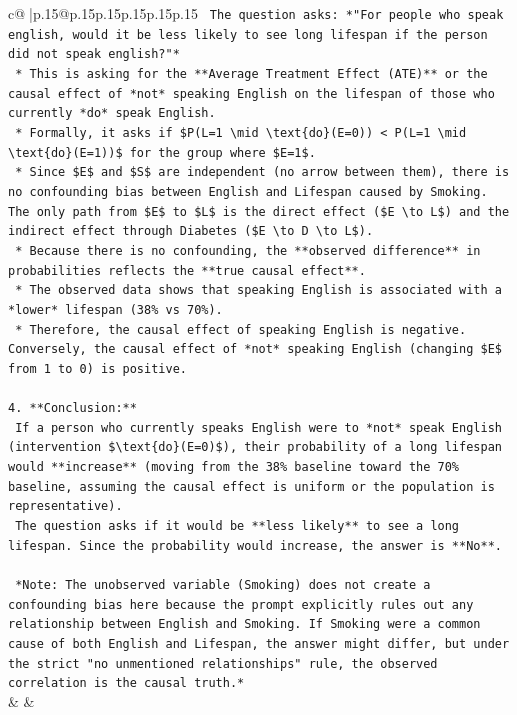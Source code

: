 \documentclass{article}
\begin{document}
{\begin{supertabular}{c@{$\;$}|p{.15\linewidth}@{}p{.15\linewidth}p{.15\linewidth}p{.15\linewidth}p{.15\linewidth}p{.15\linewidth}}
{{{\texttt{    The question asks: *"For people who speak english, would it be less likely to see long lifespan if the person did not speak english?"*} \\
\texttt{    *   This is asking for the **Average Treatment Effect (ATE)** or the causal effect of *not* speaking English on the lifespan of those who currently *do* speak English.} \\
\texttt{    *   Formally, it asks if \$P(L=1 \textbackslash{}mid \textbackslash{}text\{do\}(E=0)) < P(L=1 \textbackslash{}mid \textbackslash{}text\{do\}(E=1))\$ for the group where \$E=1\$.} \\
\texttt{    *   Since \$E\$ and \$S\$ are independent (no arrow between them), there is no confounding bias between English and Lifespan caused by Smoking. The only path from \$E\$ to \$L\$ is the direct effect (\$E \textbackslash{}to L\$) and the indirect effect through Diabetes (\$E \textbackslash{}to D \textbackslash{}to L\$).} \\
\texttt{    *   Because there is no confounding, the **observed difference** in probabilities reflects the **true causal effect**.} \\
\texttt{    *   The observed data shows that speaking English is associated with a *lower* lifespan (38\% vs 70\%).} \\
\texttt{    *   Therefore, the causal effect of speaking English is negative. Conversely, the causal effect of *not* speaking English (changing \$E\$ from 1 to 0) is positive.} \\
\\ 
\texttt{4.  **Conclusion:**} \\
\texttt{    If a person who currently speaks English were to *not* speak English (intervention \$\textbackslash{}text\{do\}(E=0)\$), their probability of a long lifespan would **increase** (moving from the 38\% baseline toward the 70\% baseline, assuming the causal effect is uniform or the population is representative).} \\
\texttt{    The question asks if it would be **less likely** to see a long lifespan. Since the probability would increase, the answer is **No**.} \\
\\ 
\texttt{    *Note: The unobserved variable (Smoking) does not create a confounding bias here because the prompt explicitly rules out any relationship between English and Smoking. If Smoking were a common cause of both English and Lifespan, the answer might differ, but under the strict "no unmentioned relationships" rule, the observed correlation is the causal truth.*} \\
            }
        }
    }
    & & \\ \\


\end{supertabular}}
\end{document}
